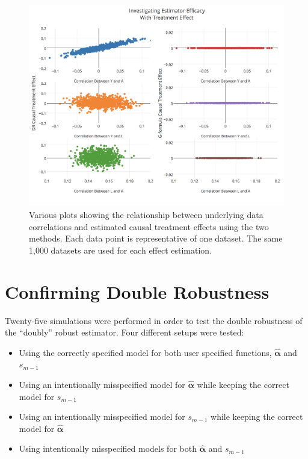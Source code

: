 \begin{figure}[h!]
\includegraphics[width = \linewidth]{figures/correlation2.png}
\caption[Scatterplots of relationships between estimates and data correlations under the alternative hypothesis]{Various plots showing the relationship between underlying data correlations and estimated causal treatment effects using the two methods.  Each data point is representative of one dataset.  The same 1,000 datasets are used for each effect estimation.}
\label{correlation2}
\end{figure}



\newpage
\section{Confirming Double Robustness} \label{doublerobust}
Twenty-five simulations were performed in order to test the double robustness of the ``doubly'' robust estimator.  Four different setups were tested: 
\begin{itemize} 
\item Using the correctly specified model for both user specified functions, $\hat{\mathbf{\alpha}}$ and $s_{m-1}$ 
\item Using an intentionally misspecified model for $\hat{\mathbf{\alpha}}$ while keeping the correct model for $s_{m-1}$ 
\item Using an intentionally misspecified model for $s_{m-1}$ while keeping the correct model for $\hat{\mathbf{\alpha}}$
\item Using intentionally misspecified models for both $\hat{\mathbf{\alpha}}$ and $s_{m-1}$ 
\end{itemize} 

